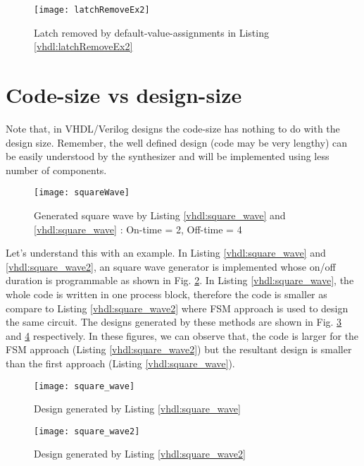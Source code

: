 \begin{figure}
	\centering
	\texttt{[image: latchRemoveEx2]}
	\caption{Latch removed by default-value-assignments in Listing \ref{vhdl:latchRemoveEx2}}
	\label{fig:latchRemoveEx2}
\end{figure}


\section{Code-size vs design-size} \label{sec:codesizeDesignSize}
Note that, in VHDL/Verilog designs the code-size has nothing to do with the design size. Remember, the well defined design (code may be very lengthy) can be easily understood by the synthesizer and will be implemented using less number of components. 

\begin{figure}
	\centering
	\texttt{[image: squareWave]}
	\caption{Generated square wave by Listing \ref{vhdl:square_wave} and \ref{vhdl:square_wave} : On-time = 2, Off-time = 4}
	\label{fig:squareWave}
\end{figure} 

Let's understand this with an example. In Listing \ref{vhdl:square_wave} and \ref{vhdl:square_wave2}, an square wave generator is implemented whose on/off duration is programmable as shown in Fig. \ref{fig:squareWave}. In Listing \ref{vhdl:square_wave}, the whole code is written in one process block, therefore the code is smaller as compare to Listing \ref{vhdl:square_wave2} where FSM approach is used to design the same circuit. The designs generated by these methods are shown in Fig. \ref{fig:square_wave} and \ref{fig:square_wave2} respectively. In these figures, we can observe that, the code is larger for the FSM approach (Listing \ref{vhdl:square_wave2}) but the resultant design is smaller than the first approach (Listing \ref{vhdl:square_wave}). 



\begin{figure}
	\centering
	\texttt{[image: square\_wave]}
	\caption{Design generated by Listing \ref{vhdl:square_wave}}
	\label{fig:square_wave}
\end{figure}

\begin{figure}
	\centering
	\texttt{[image: square\_wave2]}
	\caption{Design generated by Listing \ref{vhdl:square_wave2}}
	\label{fig:square_wave2}
\end{figure}

